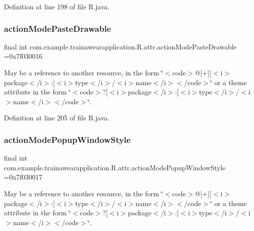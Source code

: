 Definition at line 198 of file R.\+java.

\mbox{\label{classcom_1_1example_1_1trainawearapplication_1_1_r_1_1attr_aac436a8a5352c1a44164b012e86cd7f9}} 
\subsubsection{\texorpdfstring{actionModePasteDrawable}{actionModePasteDrawable}}
{\footnotesize\ttfamily final int com.\+example.\+trainawearapplication.\+R.\+attr.\+action\+Mode\+Paste\+Drawable =0x7f030016\hspace{0.3cm}{\ttfamily [static]}}

May be a reference to another resource, in the form \char`\"{}$<$code$>$@\mbox{[}+\mbox{]}\mbox{[}$<$i$>$package$<$/i$>$\+:\mbox{]}$<$i$>$type$<$/i$>$/$<$i$>$name$<$/i$>$$<$/code$>$\char`\"{} or a theme attribute in the form \char`\"{}$<$code$>$?\mbox{[}$<$i$>$package$<$/i$>$\+:\mbox{]}$<$i$>$type$<$/i$>$/$<$i$>$name$<$/i$>$$<$/code$>$\char`\"{}. 

Definition at line 205 of file R.\+java.

\mbox{\label{classcom_1_1example_1_1trainawearapplication_1_1_r_1_1attr_a901b714797e3449fee6fed8c2c1e31fd}} 
\subsubsection{\texorpdfstring{actionModePopupWindowStyle}{actionModePopupWindowStyle}}
{\footnotesize\ttfamily final int com.\+example.\+trainawearapplication.\+R.\+attr.\+action\+Mode\+Popup\+Window\+Style =0x7f030017\hspace{0.3cm}{\ttfamily [static]}}

May be a reference to another resource, in the form \char`\"{}$<$code$>$@\mbox{[}+\mbox{]}\mbox{[}$<$i$>$package$<$/i$>$\+:\mbox{]}$<$i$>$type$<$/i$>$/$<$i$>$name$<$/i$>$$<$/code$>$\char`\"{} or a theme attribute in the form \char`\"{}$<$code$>$?\mbox{[}$<$i$>$package$<$/i$>$\+:\mbox{]}$<$i$>$type$<$/i$>$/$<$i$>$name$<$/i$>$$<$/code$>$\char`\"{}. 

